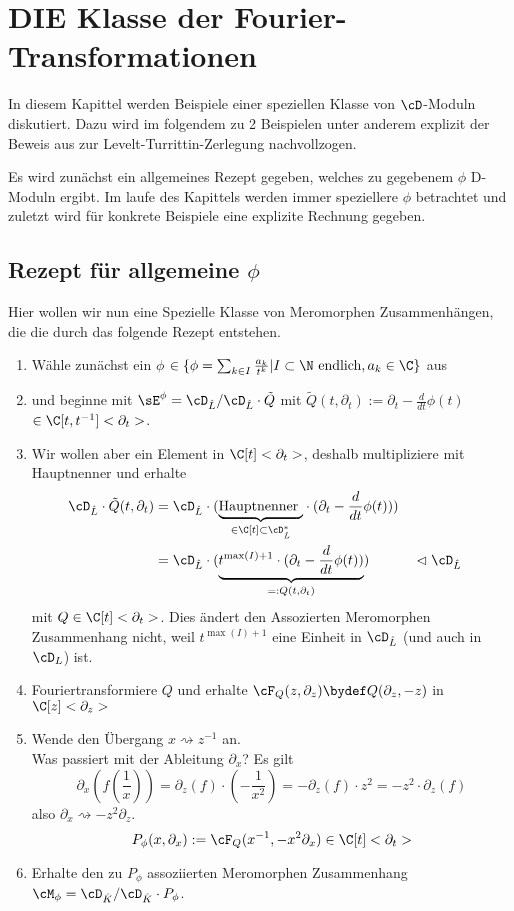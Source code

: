 \chapter{DIE Klasse der Fourier-Transformationen}
In diesem Kapittel werden Beispiele einer speziellen Klasse von $\cD$-Moduln
diskutiert. Dazu wird im folgendem zu 2 Beispielen unter anderem explizit der
Beweis aus \cite{sabbah_cimpa90} zur Levelt-Turrittin-Zerlegung nachvollzogen.

Es wird zunächst ein allgemeines Rezept gegeben, welches zu gegebenem $\phi$
D-Moduln ergibt. Im laufe des Kapittels werden immer speziellere $\phi$
betrachtet und zuletzt wird für konkrete Beispiele eine explizite Rechnung
gegeben.

\section{Rezept für allgemeine $\phi$} \label{sec:allgemeinProblem}
Hier wollen wir nun eine Spezielle Klasse von Meromorphen Zusammenhängen, die
die durch das folgende Rezept entstehen.
\begin{enumerate}
\item Wähle zunächst ein $\phi$
$\in\{\phi=\sum_{k\in I}\frac{a_k}{t^{k}}|I\subset\N\mbox{ endlich}
,a_k\in \C\}$
aus
\item und beginne mit $\sE^{\phi}=\cD_{\hat L}/\cD_{\hat L}\cdot \tilde Q$
mit
$ \tilde Q(t,\partial_t):=\partial_t-\frac{d}{dt}\phi(t)$
$\in\C[t,t^{-1}]<\partial_t>$.
\item Wir wollen aber ein Element in $\C[t]<\partial_t>$,
deshalb multipliziere mit Hauptnenner und erhalte
\begin{align*}
\cD_{\hat L}\cdot \tilde Q(t,\partial_t)
  &=\cD_{\hat L}\cdot (\underset{\in\C[t]\subset\cD_{\hat L}^*}
    {\underbrace{\mbox{Hauptnenner }}}
  \cdot (\partial_t-\frac{d}{dt}\phi(t))) \\
&=\cD_{\hat L}\cdot ( \underset{=:Q(t,\partial_t)}{\underbrace{
  t^{\max(I)+1} \cdot (\partial_t-\frac{d}{dt}\phi(t))}})
  & & \vartriangleleft\cD_{\hat L}
\end{align*}
mit $Q\in\C[t]<\partial_t>$.
Dies ändert den Assozierten Meromorphen Zusammenhang nicht, weil
$t^{\max(I)+1}$ eine Einheit in $\cD_{\hat L}$ (und auch in $\cD_{L}$) ist.
\item Fouriertransformiere $Q$ und erhalte
$\cF_Q(z,\partial_z)\bydef Q(\partial_z,-z)$ in $\C[z]<\partial_z>$
\item Wende den Übergang $x\rightsquigarrow z^{-1}$ an.\\
Was passiert mit der Ableitung $\partial_x$? Es gilt
\[
\partial_x (f(\frac{1}{x}))=
\partial_z(f)\cdot (-\frac{1}{x^2})=
-\partial_z(f)\cdot z^2= %
- z^2 \cdot \partial_z(f)
\]
also $ \partial_x\rightsquigarrow-z^2\partial_z $.
\[
P_\phi(x,\partial_x):=\cF_Q(x^{-1},-x^2\partial_x) \in \C[t]<\partial_t>
\]
\item Erhalte den zu $P_\phi$ assoziierten Meromorphen Zusammenhang
$\cM_\phi=\cD_{\hat K}/\cD_{\hat K}\cdot P_{\phi}$.
\end{enumerate}

